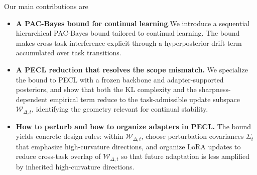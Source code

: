 \documentclass{article}
\theoremstyle{plain}
\theoremstyle{definition}
\theoremstyle{remark}
\begin{document}
Our main contributions are
\begin{itemize}
    \item \textbf{A PAC-Bayes bound for continual learning}.We introduce a sequential hierarchical PAC-Bayes bound tailored to continual learning. The bound makes cross-task interference explicit through a hyperposterior drift term accumulated over task transitions.
     \item \textbf{A PECL reduction that resolves the scope mismatch.} We specialize the bound to PECL with a frozen backbone and adapter-supported posteriors, and show that both the KL complexity and the sharpness-dependent empirical term reduce to the task-admissible update subspace $\mathcal W_{\Delta,t}$, identifying the geometry relevant for continual stability.
     
     \item \textbf{How to perturb and how to organize adapters in PECL.}
     The bound yields concrete design rules: within $\mathcal W_{\Delta,t}$, choose perturbation covariances $\Sigma_t$ that emphasize high-curvature directions, and organize LoRA updates to reduce cross-task overlap of ${\mathcal W_{\Delta,t}}$ so that future adaptation is less amplified by inherited high-curvature directions.
     
\end{itemize}
\end{document}
